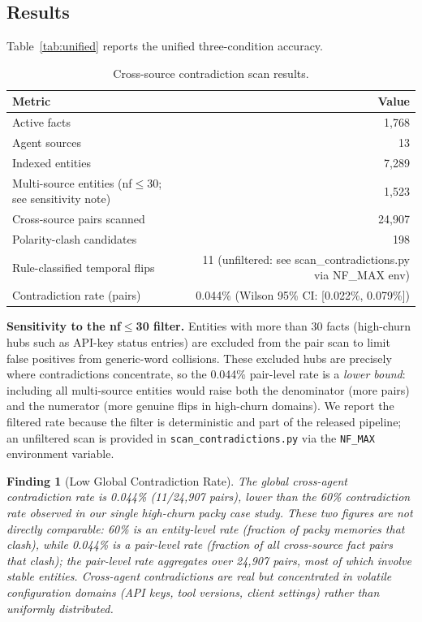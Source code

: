 \documentclass{article}
\newtheorem{finding}{Finding}
\begin{document}
\subsection{Results}

Table~\ref{tab:unified} reports the unified three-condition accuracy.

\begin{table}[h]
\centering
\caption{Cross-source contradiction scan results.}
\begin{tabular}{lr}
\toprule
Metric & Value \\
\midrule
Active facts & 1{,}768 \\
Agent sources & 13 \\
Indexed entities & 7{,}289 \\
Multi-source entities (nf$\leq$30; see sensitivity note) & 1{,}523 \\
Cross-source pairs scanned & 24{,}907 \\
Polarity-clash candidates & 198 \\
Rule-classified temporal flips & 11 (unfiltered: see scan\_contradictions.py via NF\_MAX env) \\
Contradiction rate (pairs) & 0.044\% (Wilson 95\% CI: [0.022\%, 0.079\%]) \\
\bottomrule
\end{tabular}
\end{table}

\noindent\textbf{Sensitivity to the nf$\leq$30 filter.} Entities with more than 30 facts (high-churn hubs such as API-key status entries) are excluded from the pair scan to limit false positives from generic-word collisions. These excluded hubs are precisely where contradictions concentrate, so the 0.044\% pair-level rate is a \emph{lower bound}: including all multi-source entities would raise both the denominator (more pairs) and the numerator (more genuine flips in high-churn domains). We report the filtered rate because the filter is deterministic and part of the released pipeline; an unfiltered scan is provided in \texttt{scan\_contradictions.py} via the \texttt{NF\_MAX} environment variable.

\begin{finding}[Low Global Contradiction Rate]
The global cross-agent contradiction rate is 0.044\% (11/24{,}907 pairs), lower than the 60\% contradiction rate observed in our single high-churn \emph{packy} case study. These two figures are not directly comparable: 60\% is an \emph{entity-level} rate (fraction of packy memories that clash), while 0.044\% is a \emph{pair-level} rate (fraction of all cross-source fact pairs that clash); the pair-level rate aggregates over 24{,}907 pairs, most of which involve stable entities. Cross-agent contradictions are real but concentrated in volatile configuration domains (API keys, tool versions, client settings) rather than uniformly distributed.
\end{finding}
\end{document}
